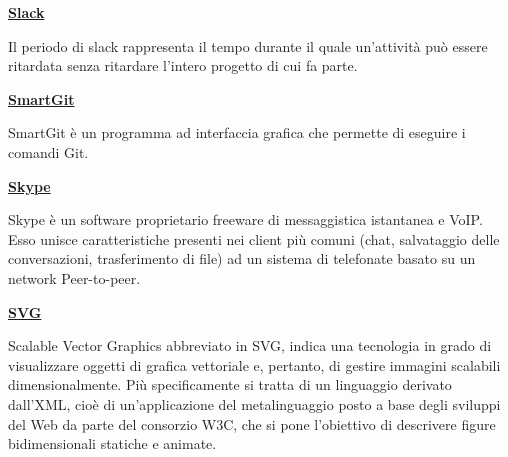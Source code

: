 \vspace*{2\bigskipamount}

\begin{addmargin}[0em]{0em}
	\textbf{\underline{Slack}}
\end{addmargin} 
	
\medskip
\begin{addmargin}[5em]{1em}	
Il periodo di slack rappresenta il tempo durante il quale un'attività può essere ritardata senza ritardare l'intero progetto di cui fa parte.
\end{addmargin}	

\bigskip
\begin{addmargin}[0em]{0em}		
	\textbf{\underline{SmartGit}}
\end{addmargin} 
	
\medskip
\begin{addmargin}[5em]{1em}	
SmartGit è un programma ad interfaccia grafica che permette di eseguire i comandi Git.	
\end{addmargin}	

\bigskip
\begin{addmargin}[0em]{0em}		
	\textbf{\underline{Skype}}
\end{addmargin}
	 
\medskip
\begin{addmargin}[5em]{1em}	
Skype è un software proprietario freeware di messaggistica istantanea e VoIP. Esso unisce caratteristiche presenti nei client più comuni (chat, salvataggio delle conversazioni, trasferimento di file) ad un sistema di telefonate basato su un network Peer-to-peer.  
\end{addmargin}	

\bigskip
\begin{addmargin}[0em]{0em}		
	\textbf{\underline{SVG}}
	\end{addmargin} 
	
\medskip
\begin{addmargin}[5em]{1em}	
Scalable Vector Graphics abbreviato in SVG, indica una tecnologia in grado di visualizzare oggetti di grafica vettoriale e, pertanto, di gestire immagini scalabili dimensionalmente.
Più specificamente si tratta di un linguaggio derivato dall'XML, cioè di un'applicazione del metalinguaggio posto a base degli sviluppi del Web da parte del consorzio W3C, che si pone l'obiettivo di descrivere figure bidimensionali statiche e animate.
\end{addmargin}	

\newpage
	
